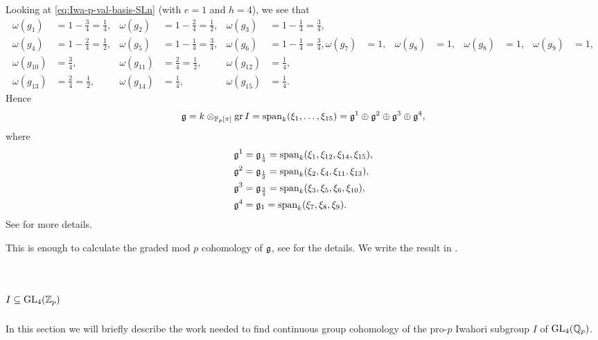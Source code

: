 Looking at \eqref{eq:Iwa-p-val-basis-SLn} (with $e=1$ and $h=4$), we see that
\begin{align*}
  \omega(g_{1}) &= 1-\frac{3}{4} = \frac{1}{4}, & \omega(g_{2}) &= 1-\frac{2}{4} = \frac{1}{2}, & \omega(g_{3}) &= 1-\frac{1}{4} = \frac{3}{4}, \\
  \omega(g_{4}) &= 1-\frac{2}{4} = \frac{1}{2}, & \omega(g_{5}) &= 1-\frac{1}{4} = \frac{3}{4}, & \omega(g_{6}) &= 1-\frac{1}{4} = \frac{3}{4},
  \omega(g_{7}) &= 1, & \omega(g_{8}) &= 1, & \omega(g_{8}) &= 1, & \omega(g_{9}) &= 1, \\
  \omega(g_{10}) &= \frac{3}{4}, &  \omega(g_{11}) &= \frac{2}{4} = \frac{1}{2}, & \omega(g_{12}) &= \frac{1}{4}, \\
  \omega(g_{13}) &= \frac{2}{4} = \frac{1}{2}, & \omega(g_{14}) &= \frac{1}{4}, & \omega(g_{15}) &= \frac{1}{4}.
\end{align*}
Hence
\begin{equation*}
  \mathfrak{g} = k \otimes_{\mathbb{F}_{p}[\pi]} \operatorname{gr} I = \operatorname{span}_{k}(\xi_{1},\dotsc,\xi_{15}) = \mathfrak{g}^{1} \oplus \mathfrak{g}^{2} \oplus \mathfrak{g}^{3} \oplus \mathfrak{g}^{4},
\end{equation*}
where
\begin{align*}
  \mathfrak{g}^{1} &= \mathfrak{g}_{\frac{1}{4}} = \operatorname{span}_{k}(\xi_{1},\xi_{12},\xi_{14},\xi_{15}), \\
  \mathfrak{g}^{2} &= \mathfrak{g}_{\frac{1}{2}} = \operatorname{span}_{k}(\xi_{2},\xi_{4},\xi_{11},\xi_{13}), \\
  \mathfrak{g}^{3} &= \mathfrak{g}_{\frac{3}{4}} = \operatorname{span}_{k}(\xi_{3},\xi_{5},\xi_{6},\xi_{10}), \\
  \mathfrak{g}^{4} &= \mathfrak{g}_{1} = \operatorname{span}_{k}(\xi_{7},\xi_{8},\xi_{9}).
\end{align*}
See  for more details.

This is enough to calculate the graded mod $p$ cohomology of $\mathfrak{g}$, see \cite{code} for the details. We write the result in .

\section{\texorpdfstring{$I \subseteq \operatorname{GL}_{4}(\mathbb{Z}_{p})$}{I in GL4(Zp)}}%
\label{sec:GL4-calc}

In this section we will briefly describe the work needed to find continuous group cohomology of the pro-$p$ Iwahori subgroup $I$ of $\operatorname{GL}_{4}(\mathbb{Q}_{p})$.

